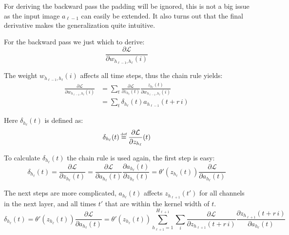 For deriving the backward pass the padding will be ignored, this is not a big issue as the input image $a_{\ell-1}$ can easily be extended. It also turns out that the final derivative makes the generalization quite intuitive.

For the backward pass we just which to derive:
\begin{equation}
\frac{\partial \mathcal{L}}{\partial w_{h_{\ell-1},h_\ell}(i)}
\end{equation}

The weight $w_{h_{\ell-1},h_\ell}(i)$ affects all time steps, thus the chain rule yields:
\begin{equation}
\begin{aligned}
\frac{\partial \mathcal{L}}{\partial w_{h_{\ell-1},h_\ell}(i)} &= \sum_{t} \frac{\partial \mathcal{L}}{\partial z_{h_\ell}(t)} \frac{z_{h_\ell}(t)}{\partial w_{h_{\ell-1},h_\ell}(i)} \\
&= \sum_{t} \delta_{h_\ell}(t) a_{h_{\ell-1}}(t + r\,i)
\end{aligned}
\end{equation}

Here $\delta_{h_\ell}(t)$ is defined as:
\begin{equation}
\delta_{h_\ell}(t) \defeq \frac{\partial \mathcal{L}}{\partial z_{h_\ell}}(t)
\end{equation}

To calculate $\delta_{h_\ell}(t)$ the chain rule is used again, the first step is easy:
\begin{equation}
\delta_{h_\ell}(t) = \frac{\partial \mathcal{L}}{\partial z_{h_\ell}(t)} = \frac{\partial \mathcal{L}}{\partial a_{h_\ell}(t)} \frac{\partial a_{h_\ell}(t)}{\partial z_{h_\ell}(t)} = \theta'(z_{h_\ell}(t)) \frac{\partial \mathcal{L}}{\partial a_{h_\ell}(t)}
\end{equation}

The next steps are more complicated, $a_{h_\ell}(t)$ affects $z_{h_{\ell+1}}(t')$ for all channels in the next layer, and all times $t'$ that are within the kernel width of $t$.
\begin{equation*}
\delta_{h_\ell}(t) = \theta'(z_{h_\ell}(t)) \frac{\partial \mathcal{L}}{\partial a_{h_\ell}(t)} = \theta'(z_{h_\ell}(t)) \sum_{h_{\ell+1}=1}^{H_{\ell+1}} \sum_{i} \frac{\partial \mathcal{L}}{\partial z_{h_{\ell+1}}(t + r\, i)} \frac{\partial z_{h_{\ell+1}}(t + r\, i)}{\partial a_{h_\ell}(t)}
\end{equation*}

